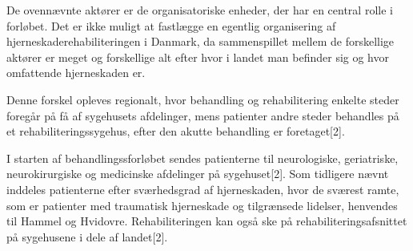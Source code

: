 
De ovennævnte aktører er de organisatoriske enheder, der har en central rolle i forløbet. Det er ikke muligt at fastlægge en egentlig organisering af hjerneskaderehabiliteringen i Danmark, da sammenspillet mellem de forskellige aktører er meget %
og forskellige alt efter hvor i landet man befinder sig og hvor omfattende hjerneskaden er. %

Denne forskel opleves regionalt, hvor behandling og rehabilitering enkelte steder foregår på få af sygehusets afdelinger, mens patienter andre steder behandles på et rehabiliteringssygehus, efter den akutte behandling er foretaget[2]. 

I starten af behandlingssforløbet sendes patienterne til neurologiske, geriatriske, neurokirurgiske og medicinske afdelinger på sygehuset[2]. Som tidligere nævnt inddeles patienterne efter sværhedsgrad af hjerneskaden, hvor de sværest ramte, som er patienter med traumatisk hjerneskade og tilgrænsede lidelser, henvendes til Hammel og Hvidovre. Rehabiliteringen kan også ske på rehabiliteringsafsnittet på sygehusene i dele af landet[2].



